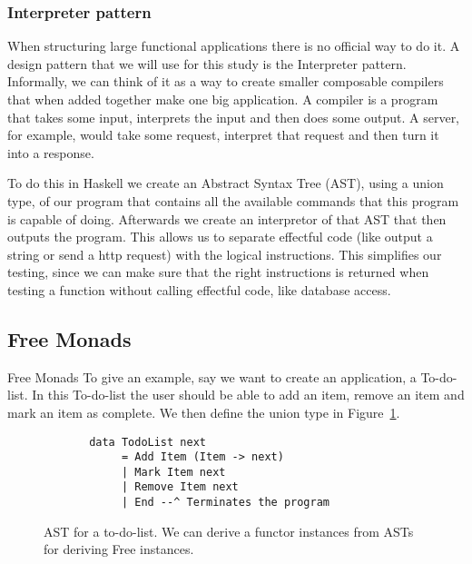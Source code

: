 \documentclass[12pt]{article}
\theoremstyle{definition}
\theoremstyle{theorem}
\begin{document}
\subsubsection{Interpreter pattern}

When structuring large functional applications there is no official way to do
it. A design pattern that we will use for this study is the Interpreter pattern.
Informally, we can think of it as a way to create smaller composable compilers
that when added together make one big application. A compiler is a program that
takes some input, interprets the input and then does some output. A server, for
example, would take some request, interpret that request and then turn it into a
response.


To do this in Haskell we create an Abstract Syntax Tree (AST), using a union
type, of our program that contains all the available commands that this program
is capable of doing. Afterwards we create an interpretor of that AST that then
outputs the program. This allows us to separate effectful code (like output a
string or send a http request) with the logical instructions. This simplifies
our testing, since we can make sure that the right instructions is returned when
testing a function without calling effectful code, like database access. 

\subsection{Free Monads}

Free Monads To give an example, say we want to create an application, a To-do-list. In this
To-do-list the user should be able to add an item, remove an item and mark an
item as complete. We then define the union type in
Figure~\ref{freeunion}.~\cite{Swierstra}

\begin{figure}[H]
    \begin{lstlisting}
       data TodoList next
            = Add Item (Item -> next)
            | Mark Item next
            | Remove Item next
            | End --^ Terminates the program
    \end{lstlisting}
    \label{freeunion}
    \caption{AST for a to-do-list. We can derive a functor instances
    from ASTs for deriving Free instances.~\cite{commentarycompiler}}
\end{figure}
\end{document}
